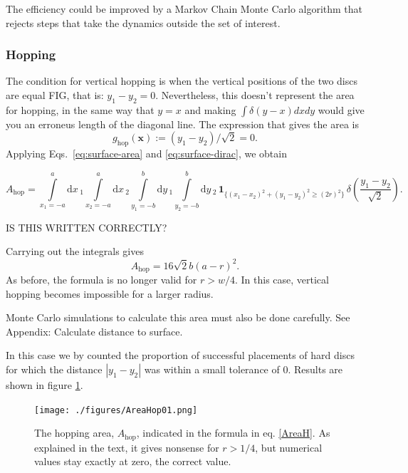 \documentclass[superscriptaddress,pre,reprint,showpacs,onecolumn]{revtex4-1}
\newcommand{\rd}[1]{\mathrm{d}{#1} \,}
\newcommand{\indicatorsymbol}{\mathbf{1}}
\newcommand{\indicator}[1]{\indicatorsymbol_{ \{   #1 \} } }
\begin{document}
The efficiency could be improved by a Markov Chain Monte Carlo algorithm that rejects steps that take the dynamics outside the set of interest.

\subsubsection{Hopping}

The condition for vertical hopping is when the vertical positions of the two discs are equal FIG, that is: $y_1-y_2=0$. Nevertheless, this doesn't represent the area for hopping,
in the same way that $y=x$ and making $ \int \delta(y-x) dx dy$  would give you an erroneus length of the diagonal line. The expression that gives the area is
$$g_\text{hop}(\mathbf{x}) := (y_1 - y_2)/\sqrt{2} = 0.$$
Applying Eqs.~\eqref{eq:surface-area} and \eqref{eq:surface-dirac}, we obtain
%
\begin{widetext}
\begin{equation}
 A_\text{hop} = \int\limits_{x_1 = -a}^a \rd x_1 \int\limits_{x_2 = -a}^a \rd x_2 
\int\limits_{y_1 = -b}^b \rd y_1 \int\limits_{y_2 = -b}^b \rd y_2 \, \indicator{ (x_1-x_2)^2 + (y_1-y_2)^2 \ge (2r)^2 } \, \delta(\frac{y_1-y_2}{\sqrt{2}}).
\end{equation}
\end{widetext}
IS THIS WRITTEN CORRECTLY?

Carrying out the integrals gives
 \begin{equation}\label{AreaH}
 A_\text{hop}  =  16 \sqrt{2} b(a-r)^2.
\end{equation}
As before, the formula is no longer valid for $r > w/4$. In this case,
vertical hopping becomes impossible for a larger radius.

Monte Carlo simulations to calculate this area must also be done carefully.
See Appendix: Calculate distance to surface.


In this case we 
by counted the proportion of successful placements of hard discs 
for which the distance 
$|y_1 - y_2|$ was within a small tolerance of $0$. 
Results are shown in figure \ref{AreaHopp01}.

\begin{figure}[h]
\centering
\texttt{[image: ./figures/AreaHop01.png]}
\caption{The hopping area, $A_\text{hop}$, 
  indicated in the formula in eq. \ref{AreaH}. As explained
in the text, it gives nonsense for $r>1/4$, but numerical values stay
exactly at zero, the correct value. } 
\label{AreaHopp01}
\end{figure}
\end{document}
